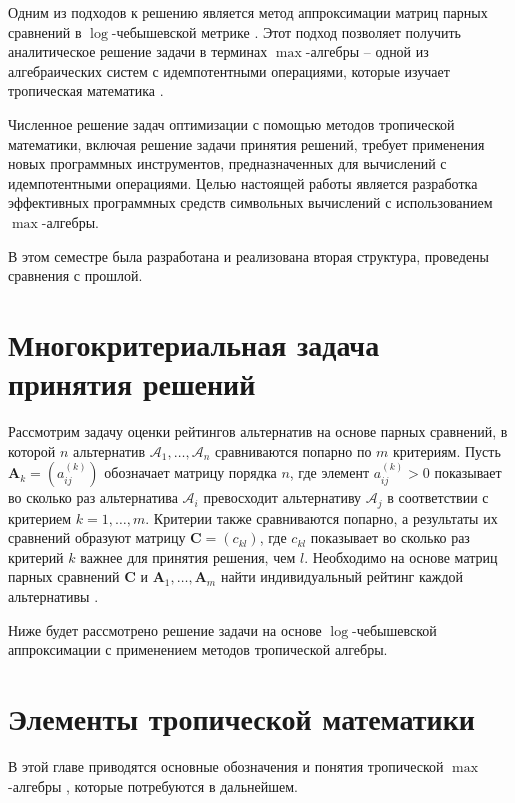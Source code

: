 \documentclass[specialist, substylefile = spbureport.rtx,
               subf,href,colorlinks=true, 12pt]{disser}
\begin{document}
    Одним из подходов к решению является метод аппроксимации матриц парных сравнений в $\log$-чебышевской метрике \cite{Krivulin2019Metody,Krivulin2019Tropical,Krivulin2022Using,Krivulin2020Reshenie}. Этот подход позволяет получить аналитическое решение задачи в терминах $\max$-алгебры -- одной из алгебраических систем с идемпотентными операциями, которые изучает тропическая математика \cite{Maslov1994Idemotent, Butkovic2010Maxlinear, Heidergott2006Max}.
    
    Численное решение задач оптимизации с помощью методов тропической математики, включая решение задачи принятия решений, требует применения новых программных инструментов, предназначенных для вычислений с идемпотентными операциями. Целью настоящей работы является разработка эффективных программных средств символьных вычислений с использованием $\max$-алгебры.

    В этом семестре была разработана и реализована вторая структура, проведены сравнения с прошлой.


    \chapter{Многокритериальная задача принятия решений}

    Рассмотрим задачу оценки рейтингов альтернатив на основе парных сравнений, в которой $n$ альтернатив $\mathcal{A}_{1}, \ldots, \mathcal{A}_{n}$ сравниваются попарно по $m$ критериям. Пусть $\bm{A}_{k} = (a_{ij}^{(k)})$ обозначает матрицу порядка $n$, где элемент $a_{ij}^{(k)}>0$ показывает во сколько раз альтернатива $\mathcal{A}_{i}$ превосходит альтернативу $\mathcal{A}_{j}$ в соответствии с критерием $k=1,\ldots,m$. Критерии также сравниваются попарно, а результаты их сравнений образуют матрицу $\bm{C}=(c_{kl})$, где $c_{kl}$ показывает во сколько раз критерий $k$ важнее для принятия решения, чем $l$. Необходимо на основе матриц парных сравнений $\bm{C}$ и $\bm{A}_{1},\ldots,\bm{A}_{m}$ найти индивидуальный рейтинг каждой альтернативы \cite{Saaty1993Prinyatie}.
    
    Ниже будет рассмотрено решение задачи на основе $\log$-чебышевской аппроксимации с применением методов тропической алгебры.

    \chapter{Элементы тропической математики}

    В этой главе приводятся основные обозначения и понятия тропической $\max$-алгебры \cite{Maslov1994Idemotent, Butkovic2010Maxlinear, Heidergott2006Max}, которые потребуются в дальнейшем.
    
\end{document}
